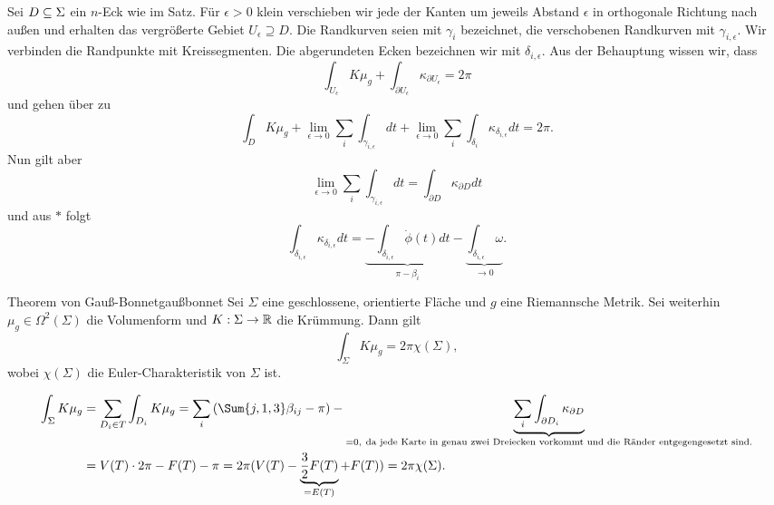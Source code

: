 \begin{beweis}
Sei $D \subseteq \Sigma$ ein $n$-Eck wie im Satz. Für $\epsilon > 0$ klein verschieben wir jede der Kanten um jeweils Abstand $\epsilon$ in orthogonale Richtung nach außen und erhalten das vergrößerte Gebiet $U_\epsilon \supseteq D$. Die Randkurven seien mit $\gamma_i$ bezeichnet, die verschobenen Randkurven mit $\gamma_{i,\epsilon}$. Wir verbinden die Randpunkte mit Kreissegmenten. Die abgerundeten Ecken bezeichnen wir mit $\delta_{i, \epsilon}$. Aus der Behauptung wissen wir, dass
\begin{equation}
\int_{U_\epsilon} K \mu_g + \int_{\partial U_\epsilon} \kappa_{\partial U_\epsilon} = 2\pi
\end{equation}
und gehen über zu
\begin{equation}
\int_D K \mu_g + \lim_{\epsilon \to 0} \sum_i \int_{\gamma_{i,\epsilon}} dt + \lim_{\epsilon \to 0} \sum_i \int_{\delta_i} \kappa_{\delta_{i, \epsilon}} dt = 2 \pi.
\end{equation}
Nun gilt aber
\begin{equation}
\lim_{\epsilon \to 0} \sum_i \int_{\gamma_{i,\epsilon}} dt = \int_{\partial D} \kappa_{\partial D} dt
\end{equation}
und aus $\ast$ folgt
\begin{equation}
\int_{\delta_{i, \epsilon}} \kappa_{\delta_{i, \epsilon}} dt = \underbrace{- \int_{\delta_{i, \epsilon}} \dot{\phi}(t) dt}_{\pi - \beta_i} - \underbrace{\int_{\delta_{i, \epsilon}} \omega}_{\to 0}.
\end{equation}
\end{beweis}

\begin{theorem}{Theorem von Gauß-Bonnet}{gaußbonnet}
Sei $\Sigma$ eine geschlossene, orientierte Fläche und $g$ eine Riemannsche Metrik. Sei weiterhin $\mu_g \in \Omega^2(\Sigma)$ die Volumenform  und $K: \Sigma \to \mathbb{R}$ die Krümmung. Dann gilt
\begin{equation}
\int_\Sigma K \mu_g = 2 \pi \chi(\Sigma),
\end{equation}
wobei $\chi(\Sigma)$ die Euler-Charakteristik von $\Sigma$ ist.
\end{theorem}
\begin{beweis}
\begin{align}
\int_\Sigma K \mu_g &= \sum_{D_i \in T} \int_{D_i} K \mu_g = \sum_i \left(\Sum{j,1,3} \beta_{ij} - \pi \right) - \underbrace{\sum_i \int_{\partial D_i} \kappa_{\partial D}}_{=0, \ \text{da jede Karte in genau zwei Dreiecken vorkommt und die Ränder entgegengesetzt sind.}}\\
&= V(T) \cdot 2 \pi - F(T) - \pi = 2\pi (V(T)- \underbrace{\frac{3}{2} F(T)}_{=E(T)} + F(T)) = 2\pi \chi(\Sigma).
\end{align}
\end{beweis}